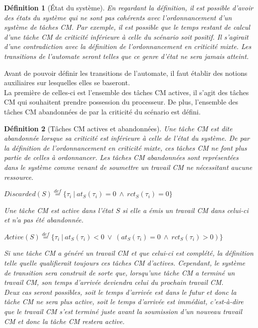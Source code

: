 \documentclass[12pt,a4paper,oneside]{book}
\theoremstyle{break}
\newtheorem{defin}{Définition}[chapter]
\theoremstyle{breakplain}
\begin{document}
\begin{defin}[État du système]
En regardant la définition, il est possible d'avoir des états du système qui ne sont pas cohérents avec l'ordonnancement d'un système de tâches CM. Par exemple, il est possible que le temps restant de calcul d'une tâche CM de criticité inférieure à celle du scénario soit positif. Il s'agirait d'une contradiction avec la définition de l'ordonnancement en criticité mixte. Les transitions de l'automate seront telles que ce genre d'état ne sera jamais atteint.
\end{defin}

Avant de pouvoir définir les transitions de l'automate, il faut établir des notions auxiliaires sur lesquelles elles se baseront.\\

La première de celles-ci est l'ensemble des tâches CM actives, il s'agit des tâches CM qui souhaitent prendre possession du processeur. De plus, l'ensemble des tâches CM abandonnées de par la criticité du scénario est défini. \\

\begin{defin}[Tâches CM actives et abandonnées]
\label{per:actdisc}
Une tâche CM est dite abandonnée lorsque sa criticité est inférieure à celle de l'état du système. De par la définition de l'ordonnancement en criticité mixte, ces tâches CM ne font plus partie de celles à ordonnancer. Les tâches CM abandonnées sont représentées dans le système comme venant de soumettre un travail CM ne nécessitant aucune ressource.

\begin{center}
$Discarded(S) \overset{def}{=} \{\tau_i\ |\ at_S(\tau_i) = 0\ \wedge\ rct_S(\tau_i) = 0\}$\\
\end{center}

Une tâche CM est active dans l'état $S$ si elle a émis un travail CM dans celui-ci et n'a pas été abandonnée.

\begin{center}
$Active(S) \overset{def}{=} \{\tau_i\ |\ at_S(\tau_i) < 0\ \vee\ (at_S(\tau_i) = 0\ \wedge\ rct_S(\tau_i) > 0)\}$\\
\end{center}

Si une tâche CM a généré un travail CM et que celui-ci est complété, la définition telle quelle qualifierait toujours ces tâches CM d'actives. Cependant, le système de transition sera construit de sorte que, lorsqu'une tâche CM a terminé un travail CM, son temps d'arrivée deviendra celui du prochain travail CM.\\
Deux cas seront possibles, soit le temps d'arrivée est dans le futur et donc la tâche CM ne sera plus active, soit le temps d'arrivée est immédiat, c'est-à-dire que le travail CM s'est terminé juste avant la soumission d'un nouveau travail CM et donc la tâche CM restera active.
\end{defin}
\end{document}
